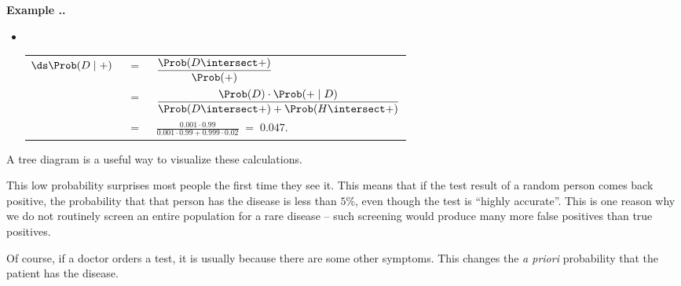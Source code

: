 \documentclass[twoside]{book}\usepackage[]{graphicx}\usepackage[]{xcolor}
\newcounter{example}[section]
\newenvironment{example}%
{\refstepcounter{example}%
\textbf{Example \thesection.\arabic{example}. }}%
{}
\begin{document}
\begin{example}
\begin{itemize}
	  \item $\!\!\!\!\!$
	  \begin{tabular}[t]{rcl}
	  $\ds \Prob(D \mid +) $
		&$\! = \!$& $\displaystyle \frac{\Prob(D \intersect +)}{\Prob(+)}$
		\\[5mm]
		&$\; = \;$& 
		$\displaystyle \frac{\Prob(D) \cdot \Prob(+ \mid D)}{\Prob(D \intersect +) 
			+ \Prob(H \intersect +)  }$
			\\[5mm]
			& $\! = \!$ & $\displaystyle 
				\frac{0.001 \cdot 0.99}{0.001 \cdot 0.99 + 0.999 \cdot 0.02}
		            \; = \;  0.047$. 
		\end{tabular}
	  \end{itemize}
	  A tree diagram is a useful way to visualize these calculations.
\begin{center}
\end{center}

	  This low probability surprises most people the first time they see it.
	  This means that if the test result of a random person comes back positive,
	  the probability that that person has the disease is less than $5$\%, 
	  even though the test is ``highly accurate''.   
	  This is one reason why we do not routinely 
	  screen an entire population for a rare disease -- such screening would 
	  produce many more false positives than true positives.

	  Of course, if a doctor orders a test, it is usually because there 
	  are some other symptoms.  This changes the \emph{a priori} probability
	  that the patient has the disease.  
\end{example}

\newpage
\end{document}
